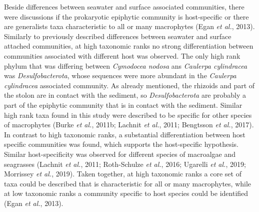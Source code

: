 \documentclass[12pt,]{article}
\begin{document}
Beside differences between seawater and surface associated communities,
there were discussions if the prokaryotic epiphytic community is
host-specific or there are generalists taxa characteristic to all or
many macrophytes (Egan \emph{et al.}, 2013). Similarly to previously
described differences between seawater and surface attached communities,
at high taxonomic ranks no strong differentiation between communities
associated with different host was observed. The only high rank phylum
that was differing between \emph{Cymodocea nodosa} ans \emph{Caulerpa
cylindracea} was \emph{Desulfobacterota}, whose sequences were more
abundant in the \emph{Caulerpa cylindracea} associated community. As
already mentioned, the rhizoids and part of the stolon are in contact
with the sediment, so \emph{Desulfobacterota} are probably a part of the
epiphytic community that is in contact with the sediment. Similar high
rank taxa found in this study were described to be specific for other
species of macrophytes (Burke \emph{et al.}, 2011b; Lachnit \emph{et
al.}, 2011; Bengtsson \emph{et al.}, 2017). In contrast to high
taxonomic ranks, a substantial differentiation between host specific
communities was found, which supports the host-specific hypothesis.
Similar host-specificity was observed for different species of
macroalgae and seagrasses (Lachnit \emph{et al.}, 2011; Roth-Schulze
\emph{et al.}, 2016; Ugarelli \emph{et al.}, 2019; Morrissey \emph{et
al.}, 2019). Taken together, at high taxonomic ranks a core set of taxa
could be described that is characteristic for all or many macrophytes,
while at low taxonomic ranks a community specific to host species could
be identified (Egan \emph{et al.}, 2013).
\end{document}

